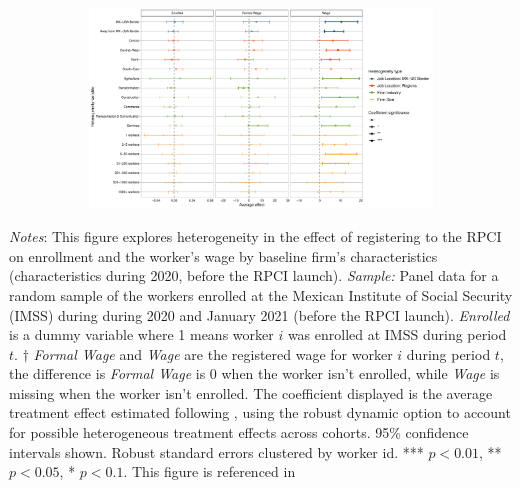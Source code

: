 \documentclass[oneside,11pt]{article}
\begin{document}
\clearpage


\begin{figure}[H]
    \centering
    \caption{Heterogeneity by firm characteristics \label{fig:heterogeneity_firm_rpci}}
    
    \begin{subfigure}{\textwidth}
    \includegraphics[width=\textwidth]{04_Figures/muestra_10porciento/dcdh_heterogeneity_firm_characteristics_paper.pdf}
    \end{subfigure}
    
\end{figure}

\scriptsize{
\noindent \textit{Notes}: This figure explores heterogeneity in the effect of registering to the RPCI on enrollment and the worker's wage by baseline firm's characteristics (characteristics during 2020, before the RPCI launch). \textit{Sample:} Panel data for a random sample of the workers enrolled at the Mexican Institute of Social Security (IMSS) during during 2020 and January 2021 (before the RPCI launch). \textit{Enrolled} is a dummy variable where 1 means worker $i$ was enrolled at IMSS during period $t$. $\dagger$ \textit{Formal Wage} and \textit{Wage} are the registered wage for worker $i$ during period $t$, the difference is \textit{Formal Wage} is 0 when the worker isn't enrolled, while \textit{Wage} is missing when the worker isn't enrolled. The coefficient displayed is the average treatment effect estimated following \cite{de2020two}, using the robust dynamic option to account for possible heterogeneous treatment effects across cohorts. 95\% confidence intervals shown. Robust standard errors clustered by worker id. *** $p<0.01$, ** $p<0.05$, * $p<0.1$. This figure is referenced in %
}

\clearpage


\newpage

\end{document}
